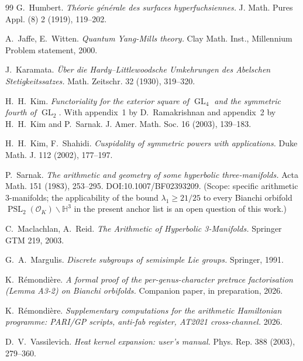 \documentclass[11pt,a4paper]{article}
\theoremstyle{definition}
\DeclareMathOperator{\PSL}{PSL}
\DeclareMathOperator{\GL}{GL}
\newcommand{\HH}{\mathbb{H}}
\newcommand{\OK}{\mathcal{O}_K}
\begin{document}
\begin{thebibliography}{99}
 G.~Humbert. \emph{Th\'eorie g\'en\'erale des surfaces
hyperfuchsiennes.} J. Math. Pures Appl. (8) 2 (1919), 119--202.

 A.~Jaffe, E.~Witten.
\emph{Quantum Yang-Mills theory.}
Clay Math. Inst., Millennium Problem statement, 2000.

 J.~Karamata. \emph{\"Uber die Hardy--Littlewoodsche
Umkehrungen des Abelschen Stetigkeitssatzes.}
Math. Zeitschr. 32 (1930), 319--320.

 H.~H.~Kim. \emph{Functoriality for the exterior square of
$\GL_4$ and the symmetric fourth of $\GL_2$.} With appendix~1 by
D.~Ramakrishnan and appendix~2 by H.~H.~Kim and P.~Sarnak.
J. Amer. Math. Soc. 16 (2003), 139--183.

 H.~H.~Kim, F.~Shahidi.
\emph{Cuspidality of symmetric powers with applications.}
Duke Math. J. 112 (2002), 177--197.

 P.~Sarnak. \emph{The arithmetic and geometry of some
hyperbolic three-manifolds.}
Acta Math. 151 (1983), 253--295. DOI:10.1007/BF02393209.
(Scope: specific arithmetic 3-manifolds; the applicability of the bound
$\lambda_1\geq 21/25$ to every Bianchi orbifold $\PSL_2(\OK)\backslash\HH^3$
in the present anchor list is an open question of this work.)

 C.~Maclachlan, A.~Reid.
\emph{The Arithmetic of Hyperbolic 3-Manifolds.}
Springer GTM 219, 2003.

 G.~A.~Margulis. \emph{Discrete subgroups of
semisimple Lie groups.} Springer, 1991.

 K.~R\'emondi\`ere.
\emph{A formal proof of the per-genus-character pretrace factorisation
(Lemma A3-2) on Bianchi orbifolds.} Companion paper, in preparation, 2026.

 K.~R\'emondi\`ere.
\emph{Supplementary computations for the arithmetic Hamiltonian programme:
PARI/GP scripts, anti-fab register, AT2021 cross-channel.} 2026.

 D.~V.~Vassilevich. \emph{Heat kernel expansion:
user's manual.} Phys. Rep. 388 (2003), 279--360.

\end{thebibliography}
\end{document}
